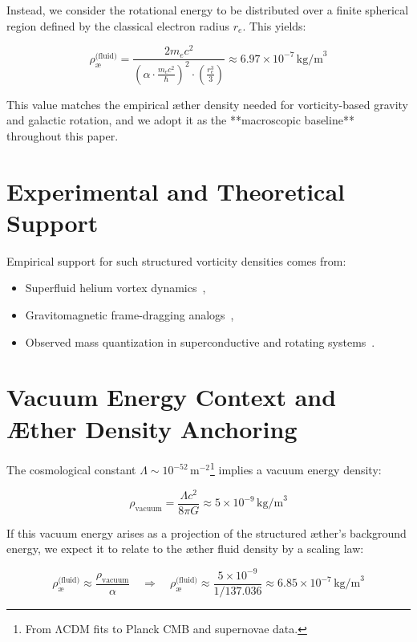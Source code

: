 \documentclass[12pt]{article}
\begin{document}
    Instead, we consider the rotational energy to be distributed over a finite spherical region defined by the classical electron radius \( r_e \). This yields:

    \[
        \rho_{\text{\ae}}^{\text{(fluid)}} = \frac{2 m_e c^2}{\left(\alpha \cdot \frac{m_e c^2}{\hbar}\right)^2 \cdot \left(\frac{r_e^3}{3}\right)} \approx 6.97 \times 10^{-7} \, \text{kg/m}^3
    \]

    This value matches the empirical æther density needed for vorticity-based gravity and galactic rotation, and we adopt it as the **macroscopic baseline** throughout this paper.

    \section{Experimental and Theoretical Support}

    Empirical support for such structured vorticity densities comes from:

    \begin{itemize}
        \item Superfluid helium vortex dynamics~\cite{jackson2021},
        \item Gravitomagnetic frame-dragging analogs~\cite{paris2015},
        \item Observed mass quantization in superconductive and rotating systems~\cite{santiago2011}.
    \end{itemize}

    \section{Vacuum Energy Context and Æther Density Anchoring}

    The cosmological constant \( \Lambda \sim 10^{-52} \, \text{m}^{-2} \)\footnote{From ΛCDM fits to Planck CMB and supernovae data.} implies a vacuum energy density:

    \[
        \rho_{\text{vacuum}} = \frac{\Lambda c^2}{8\pi G} \approx 5 \times 10^{-9} \, \text{kg/m}^3
    \]

    If this vacuum energy arises as a projection of the structured æther's background energy, we expect it to relate to the æther fluid density by a scaling law:

    \[
        \rho_{\text{\ae}}^{\text{(fluid)}} \approx \frac{\rho_{\text{vacuum}}}{\alpha}
        \quad \Rightarrow \quad
        \rho_{\text{\ae}}^{\text{(fluid)}} \approx \frac{5 \times 10^{-9}}{1/137.036} \approx 6.85 \times 10^{-7} \, \text{kg/m}^3
    \]
\end{document}
